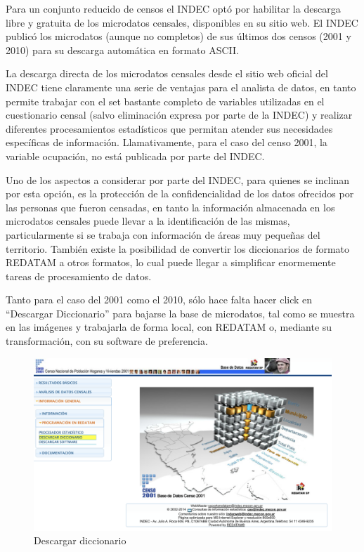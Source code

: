 \documentclass[
]{book}
\begin{document}
Para un conjunto reducido de censos el INDEC optó por habilitar la descarga libre y gratuita de los microdatos censales, disponibles en su sitio web. El INDEC publicó los microdatos (aunque no completos) de sus últimos dos censos (2001 y 2010) para su descarga automática en formato ASCII.

La descarga directa de los microdatos censales desde el sitio web oficial del INDEC tiene claramente una serie de ventajas para el analista de datos, en tanto permite trabajar con el set bastante completo de variables utilizadas en el cuestionario censal (salvo eliminación expresa por parte de la INDEC) y realizar diferentes procesamientos estadísticos que permitan atender sus necesidades específicas de información. Llamativamente, para el caso del censo 2001, la variable ocupación, no está publicada por parte del INDEC.

Uno de los aspectos a considerar por parte del INDEC, para quienes se inclinan por esta opción, es la protección de la confidencialidad de los datos ofrecidos por las personas que fueron censadas, en tanto la información almacenada en los microdatos censales puede llevar a la identificación de las mismas, particularmente si se trabaja con información de áreas muy pequeñas del territorio. También existe la posibilidad de convertir los diccionarios de formato REDATAM a otros formatos, lo cual puede llegar a simplificar enormemente tareas de procesamiento de datos.

Tanto para el caso del 2001 como el 2010, sólo hace falta hacer click en ``Descargar Diccionario'' para bajarse la base de microdatos, tal como se muestra en las imágenes y trabajarla de forma local, con REDATAM o, mediante su transformación, con su software de preferencia.

\begin{figure}

{\centering \includegraphics[width=0.8\linewidth]{imagenes/dic2001} 

}

\caption{Descargar diccionario}\label{fig:unnamed-chunk-31}
\end{figure}
\end{document}
